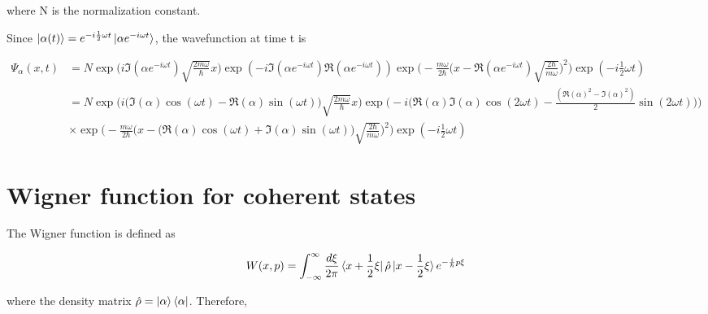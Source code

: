 \documentclass{article}
\begin{document}
        where N is the normalization constant.

        Since $\ket{\alpha(t)}=e^{-i\frac{1}{2}\omega t}\ket{\alpha e^{-i\omega t}}$, the wavefunction at time t is 

        \begin{equation}
            \begin{split}
                \Psi_\alpha(x,t) &= N \exp\biggl(i\Im(\alpha e^{-i\omega t})\sqrt{\frac{2m\omega}{\hbar}}x\biggr) \exp(-i\Im(\alpha e^{-i\omega t})\Re(\alpha e^{-i\omega t})) \exp\biggl(-\frac{m\omega}{2\hbar} \bigl(x-\Re(\alpha e^{-i\omega t})\sqrt{\frac{2\hbar}{m\omega}}\bigr)^2 \biggr) \exp(-i\frac{1}{2}\omega t) \\
                    &= N \exp\biggl(i\bigl(\Im(\alpha)\cos(\omega t)-\Re(\alpha)\sin(\omega t)\bigr) \sqrt{\frac{2m\omega}{\hbar}}x\biggr) \exp\biggl(-i\bigl(\Re(\alpha)\Im(\alpha)\cos(2\omega t)-\frac{(\Re(\alpha)^2-\Im(\alpha)^2)}{2}\sin(2\omega t)\bigr)\biggr) \\
                    &\times \exp\biggl(-\frac{m\omega}{2\hbar} \bigl(x-\big(\Re(\alpha)\cos(\omega t)+\Im(\alpha)\sin(\omega t)\big)\sqrt{\frac{2\hbar}{m\omega}}\bigr)^2 \biggr) \exp(-i\frac{1}{2}\omega t)
            \end{split}
        \end{equation}
        

    \section{Wigner function for coherent states}

        The Wigner function is defined as 

        \begin{equation}
            W(x, p) = \int_{-\infty}^\infty \frac{d\xi}{2\pi}\bra{x+\frac{1}{2}\xi}\hat{\rho}\ket{x-\frac{1}{2}\xi} e^{-\frac{i}{\hbar}p\xi}
        \end{equation}
        
        where the density matrix $\hat{\rho}=\ket{\alpha}\bra{{\alpha}}$. Therefore, 
\end{document}
